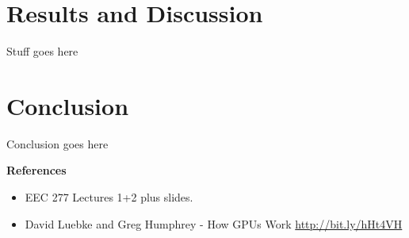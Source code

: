 \documentclass[12pt] {article}
\begin{document}
\section{Results and Discussion}
Stuff goes here

\section{Conclusion}
Conclusion goes here

\clearpage
\large \bf {References}
\medskip

\normalsize
\begin{itemize}
	
	\item EEC 277 Lectures 1+2 plus slides.
	
	\item David Luebke and Greg Humphrey - How GPUs Work \newline
	\url {http://bit.ly/hHt4VH}

\end{itemize}
\end{document}
